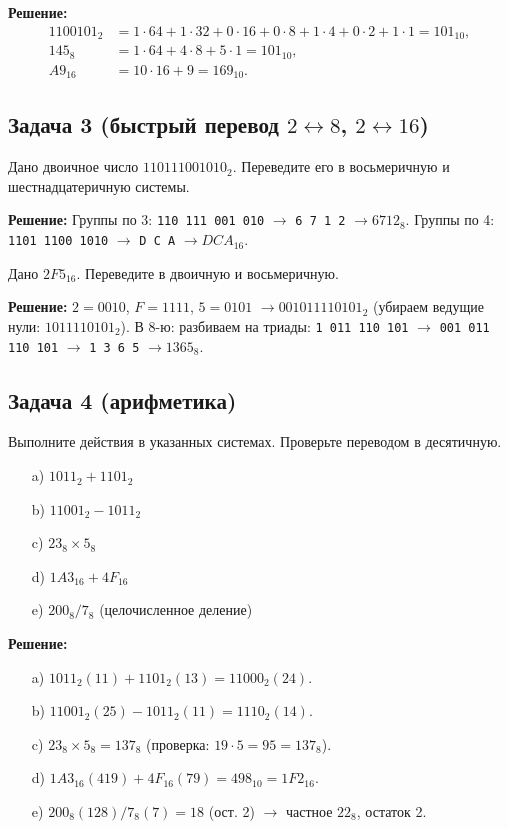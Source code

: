 \documentclass[a4paper,14pt]{report}
\begin{document}
\textbf{Решение:}
\begin{align*}
1100101_2 &= 1\cdot64 + 1\cdot32 + 0\cdot16 + 0\cdot8 + 1\cdot4 + 0\cdot2 + 1\cdot1 = 101_{10},\\
145_8     &= 1\cdot64 + 4\cdot8 + 5\cdot1 = 101_{10},\\
A9_{16}   &= 10\cdot16 + 9 = 169_{10}.
\end{align*}

\subsection*{Задача 3 (быстрый перевод $2\leftrightarrow 8$, $2\leftrightarrow 16$)}
Дано двоичное число $110111001010_2$. Переведите его в восьмеричную и шестнадцатеричную системы.

\textbf{Решение:}
Группы по 3: \texttt{110 111 001 010} $\to$ \texttt{6 7 1 2} $\to 6712_8$.
Группы по 4: \texttt{1101 1100 1010} $\to$ \texttt{D C A} $\to DCA_{16}$.

Дано $2F5_{16}$. Переведите в двоичную и восьмеричную.

\textbf{Решение:}
$2=0010$, $F=1111$, $5=0101$ $\to 001011110101_2$ (убираем ведущие нули: $1011110101_2$).
В 8-ю: разбиваем на триады: \texttt{1 011 110 101} $\to$ \texttt{001 011 110 101} $\to$ \texttt{1 3 6 5} $\to 1365_8$.

\subsection*{Задача 4 (арифметика)}
Выполните действия в указанных системах. Проверьте переводом в десятичную.
\begin{enumerate}
    \item[a)] $1011_2 + 1101_2$
    \item[b)] $11001_2 - 1011_2$
    \item[c)] $23_8 \times 5_8$
    \item[d)] $1A3_{16} + 4F_{16}$
    \item[e)] $200_8 / 7_8$ (целочисленное деление)
\end{enumerate}

\textbf{Решение:}
\begin{enumerate}
    \item[a)] $1011_2 (11) + 1101_2 (13) = 11000_2 (24)$.
    \item[b)] $11001_2 (25) - 1011_2 (11) = 1110_2 (14)$.
    \item[c)] $23_8 \times 5_8 = 137_8$ (проверка: $19\cdot5=95=137_8$).
    \item[d)] $1A3_{16} (419) + 4F_{16} (79) = 498_{10} = 1F2_{16}$.
    \item[e)] $200_8 (128) / 7_8 (7) = 18$ (ост. 2) $\to$ частное $22_8$, остаток 2.
\end{enumerate}
\end{document}
